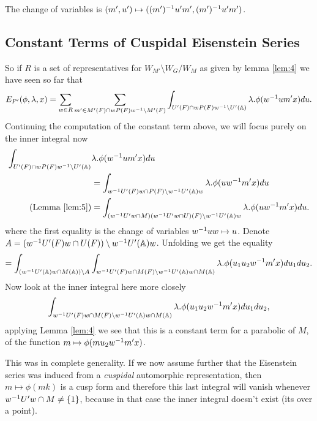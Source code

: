     The change of variables is \((m', u') \mapsto ((m')^{-1} u' m', (m')^{-1} u' m')\).

\subsection{Constant Terms of Cuspidal Eisenstein Series}    
    So if \(R\) is a set of representatives for \(W_{M'}\setminus W_G / W_{M}\) as given by lemma \ref{lem:4} we have seen so far that 
    \[ E_{P'}( \phi, \lambda, x) =\sum_{ w\in R} \sum_{m'\in M'(F)\cap wP(F)w\inv\setminus M'(F)} \int_{U'(F)\cap wP(F)w\inv \setminus U'(\A)} \lambda.\phi( w\inv um' x)  du. \]
    Continuing the computation of the constant term above, we will focus purely on the inner integral now
    \begin{equation*}
        \begin{aligned}
            \int_{U'(F)\cap wP(F)w\inv \setminus U'(\A)}& \lambda.\phi( w\inv um' x)  du \\&= \int_{w\inv U'(F)w \cap P(F) \setminus w\inv U'(\A)w} \lambda.\phi( uw\inv m' x)  du \\
            (\text{Lemma \ref{lem:5}})&= \int_{(w\inv U' w \cap M)(w\inv U' w \cap U)(F) \setminus w\inv U'(\A)w} \lambda.\phi( uw\inv m' x)  du . \\
        \end{aligned}
    \end{equation*}
    where the first equality is the change of variables \(w^{-1} u w\mapsto u \). Denote \(A = (w\inv U'(F) w \cap U(F) ) \setminus w\inv U'(\A)w \). Unfolding we get the equality
    \[= \int_{(w\inv U'(\A)w \cap M(\A)) \setminus A} \int_{w\inv U'(F) w \cap M(F) \setminus w\inv U'(\A)w \cap M(\A)} \lambda.\phi( u_1 u_2 w\inv m' x)  du_1 du_2.\]
     Now look at the inner integral here more closely 
    \[ \int_{w\inv U'(F) w \cap M(F) \setminus w\inv U'(\A)w \cap M(\A)}\lambda. \phi( u_1 u_2 w\inv m' x)  du_1 du_2,\]
    applying Lemma \ref{lem:4} we see that this is a constant term for a parabolic of \(M\), of the function \(m\mapsto \phi(m u_2 w\inv m' x)\). 
\begin{comment}
	    \begin{Lemma}
        \(u_2 w\inv m' x \in K\) with variables as above.
    \end{Lemma}
\end{comment}
    This was in complete generality. If we now assume further that the Eisenstein series was induced from a \textit{cuspidal} automorphic representation, then \(m\mapsto \phi(mk)\) is a cusp form and therefore this last integral will vanish whenever \(w^{-1} U'w \cap M \neq \{1\}\), because in that case the inner integral doesn't exist (its over a point).

